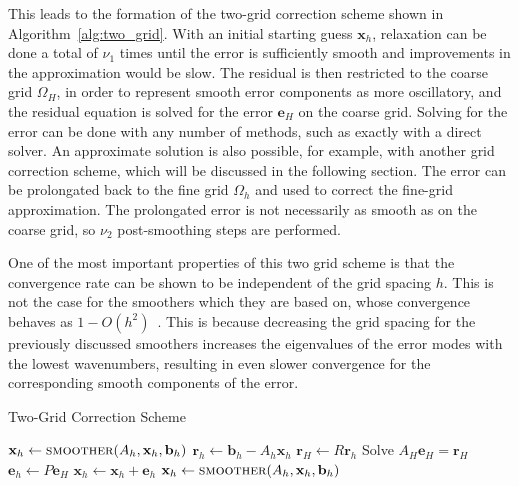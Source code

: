 This leads to the formation of the two-grid correction scheme shown in Algorithm~\ref{alg:two_grid}. With an initial starting guess $\mathbf{x}_h$, relaxation can be done a total of $\nu_1$ times until the error is sufficiently smooth and improvements in the approximation would be slow. The residual is then restricted to the coarse grid $\Omega_H$, in order to represent smooth error components as more oscillatory, and the residual equation is solved for the error $\mathbf{e}_H$ on the coarse grid. Solving for the error can be done with any number of methods, such as exactly with a direct solver. An approximate solution is also possible, for example, with another grid correction scheme, which will be discussed in the following section. The error can be prolongated back to the fine grid $\Omega_h$ and used to correct the fine-grid approximation. The prolongated error is not necessarily as smooth as on the coarse grid, so $\nu_2$ post-smoothing steps are performed.

One of the most important properties of this two grid scheme is that the convergence rate can be shown to be independent of the grid spacing $h$. This is not the case for the smoothers which they are based on, whose convergence behaves as $1 - O(h^2)$~\cite{Wesseling2004}. This is because decreasing the grid spacing for the previously discussed smoothers increases the eigenvalues of the error modes with the lowest wavenumbers, resulting in even slower convergence for the corresponding smooth components of the error.

\begin{algorithm}
	\caption{Two-Grid Correction Scheme}\label{alg:two_grid}
	\begin{algorithmic}[1]
			\State $\mathbf{x}_h \gets \Call{smoother}{A_h, \mathbf{x}_h, \mathbf{b}_h}$ 
		\EndFor
		\State $\mathbf{r}_h \gets \mathbf{b}_h - A_h \mathbf{x}_h$ 
		\State $\mathbf{r}_H \gets R \mathbf{r}_h$ 
		\State Solve $A_H \mathbf{e}_H = \mathbf{r}_H$  \label{alg:two_grid_solve}
		\State $\mathbf{e}_h \gets P \mathbf{e}_H$ 
		\State $\mathbf{x}_h \gets \mathbf{x}_h + \mathbf{e}_h$ 
			\State $\mathbf{x}_h \gets \Call{smoother}{A_h, \mathbf{x}_h, \mathbf{b}_h}$ 
		\EndFor
		\EndProcedure
	\end{algorithmic}
\end{algorithm}

